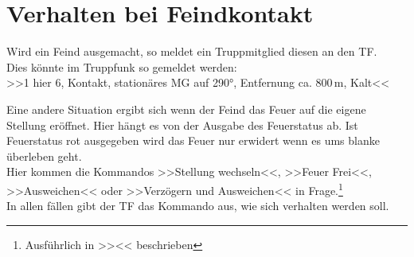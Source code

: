 \pagebreak
\section{Verhalten bei Feindkontakt}
Wird ein Feind ausgemacht, so meldet ein Truppmitglied diesen an den TF.\\

Dies könnte im Truppfunk so gemeldet werden:\\
>>1 hier 6, Kontakt, stationäres MG auf 290°, Entfernung ca. 800\,m, Kalt<<

Eine andere Situation ergibt sich wenn der Feind das Feuer auf die eigene Stellung eröffnet. Hier hängt es von der Ausgabe des Feuerstatus ab. Ist Feuerstatus rot ausgegeben wird das Feuer nur erwidert wenn es ums blanke überleben geht.\\

Hier kommen die Kommandos >>Stellung wechseln<<, >>Feuer Frei<<, >>Ausweichen<< oder >>Verzögern und Ausweichen<< in Frage.\footnote{Ausführlich in >><< beschrieben}\\

In allen fällen gibt der TF das Kommando aus, wie sich verhalten werden soll.